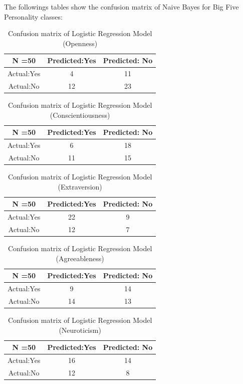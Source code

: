 The followings tables show the confusion matrix of Naive Bayes for Big Five Personality classes:
\begin{table}[!ht]
\centering
\begin{tabular}{ |c|c|c| }
 \hline
 N =50 & Predicted:Yes & Predicted: No \\
 \hline
 Actual:Yes&4 & 11 \\
 \hline
 Actual:No&12 & 23 \\
 \hline
\end{tabular}
\caption{Confusion matrix of Logistic Regression Model (Openness)}

\end{table}

\begin{table}[!ht]
\centering
\begin{tabular}{ |c|c|c| }
 \hline
 N =50 & Predicted:Yes & Predicted: No \\
 \hline
 Actual:Yes&6 & 18 \\
 \hline
 Actual:No&11 & 15 \\
 \hline
\end{tabular}
\caption{Confusion matrix of Logistic Regression Model (Conscientiousness)}
\end{table}

\begin{table}[!ht]
\centering
\begin{tabular}{ |c|c|c| }
 \hline
 N =50 & Predicted:Yes & Predicted: No \\
 \hline
 Actual:Yes&22 & 9 \\
 \hline
 Actual:No&12 & 7 \\
 \hline
\end{tabular}
 \caption{Confusion matrix of Logistic Regression Model (Extraversion)}
\end{table}

\begin{table}[!ht]
\centering
\begin{tabular}{ |c|c|c| }
 \hline
 N =50 & Predicted:Yes & Predicted: No \\
 \hline
 Actual:Yes&9 & 14 \\
 \hline
 Actual:No&14 & 13 \\
 \hline
\end{tabular}
 \caption{Confusion matrix of Logistic Regression Model (Agreeableness)}
\end{table}

\begin{table}[!h]
\centering
\begin{tabular}{ |c|c|c| }
 \hline
 N =50 & Predicted:Yes & Predicted: No \\
 \hline
 Actual:Yes&16 & 14 \\
 \hline
 Actual:No&12 & 8 \\
 \hline
\end{tabular}
 \caption{Confusion matrix of Logistic Regression Model (Neuroticism)}
\end{table}


